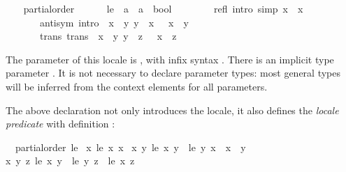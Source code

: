 \begin{isabellebody}
\isamarkuptrue%
\ \ \isamarkupfalse%
\ partial{\isacharunderscore}order\ {\isacharequal}\isanewline
\ \ \ \ \ le\ {\isacharcolon}{\isacharcolon}\ {\isachardoublequoteopen}{\isacharprime}a\ {\isasymRightarrow}\ {\isacharprime}a\ {\isasymRightarrow}\ bool{\isachardoublequoteclose}\ {\isacharparenleft}\ {\isachardoublequoteopen}{\isasymsqsubseteq}{\isachardoublequoteclose}\ {}{}{\isacharparenright}\isanewline
\ \ \ \ \ refl\ {\isacharbrackleft}intro{\isacharcomma}\ simp{\isacharbrackright}{\isacharcolon}\ {\isachardoublequoteopen}x\ {\isasymsqsubseteq}\ x{\isachardoublequoteclose}\isanewline
\ \ \ \ \ \ \ anti{\isacharunderscore}sym\ {\isacharbrackleft}intro{\isacharbrackright}{\isacharcolon}\ {\isachardoublequoteopen}{\isasymlbrakk}\ x\ {\isasymsqsubseteq}\ y{\isacharsemicolon}\ y\ {\isasymsqsubseteq}\ x\ {\isasymrbrakk}\ {\isasymLongrightarrow}\ x\ {\isacharequal}\ y{\isachardoublequoteclose}\isanewline
\ \ \ \ \ \ \ trans\ {\isacharbrackleft}trans{\isacharbrackright}{\isacharcolon}\ {\isachardoublequoteopen}{\isasymlbrakk}\ x\ {\isasymsqsubseteq}\ y{\isacharsemicolon}\ y\ {\isasymsqsubseteq}\ z\ {\isasymrbrakk}\ {\isasymLongrightarrow}\ x\ {\isasymsqsubseteq}\ z{\isachardoublequoteclose}%
\begin{isamarkuptext}%
The parameter of this locale is , with infix syntax
  \isa{{\isasymsqsubseteq}}.  There is an implicit type parameter .  It
  is not necessary to declare parameter types: most general types will
  be inferred from the context elements for all parameters.

  The above declaration not only introduces the locale, it also
  defines the \emph{locale predicate}  with
  definition :
  \begin{isabelle}%
\ \ partial{\isacharunderscore}order\ {\isacharquery}le\ {\isasymequiv}\isanewline
\isaindent{\ \ }{\isacharparenleft}{\isasymforall}x{\isachardot}\ {\isacharquery}le\ x\ x{\isacharparenright}\ {\isasymand}\isanewline
\isaindent{\ \ }{\isacharparenleft}{\isasymforall}x\ y{\isachardot}\ {\isacharquery}le\ x\ y\ {\isasymlongrightarrow}\ {\isacharquery}le\ y\ x\ {\isasymlongrightarrow}\ x\ {\isacharequal}\ y{\isacharparenright}\ {\isasymand}\isanewline
\isaindent{\ \ }{\isacharparenleft}{\isasymforall}x\ y\ z{\isachardot}\ {\isacharquery}le\ x\ y\ {\isasymlongrightarrow}\ {\isacharquery}le\ y\ z\ {\isasymlongrightarrow}\ {\isacharquery}le\ x\ z{\isacharparenright}%
\end{isabelle}


\end{isamarkuptext}
\end{isabellebody}
